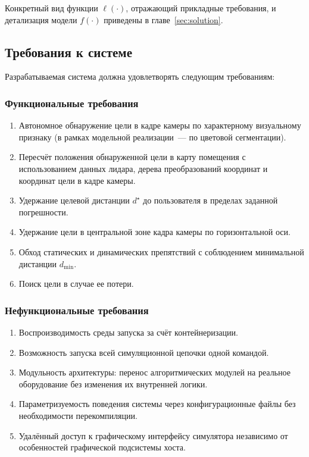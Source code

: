 Конкретный вид функции $\ell(\cdot)$, отражающий прикладные требования, и
детализация модели $f(\cdot)$ приведены в главе~\ref{sec:solution}.

\subsection{Требования к системе}

Разрабатываемая система должна удовлетворять следующим требованиям:

\subsubsection{Функциональные требования}

\begin{enumerate}
    \item Автономное обнаружение цели в кадре камеры по характерному
          визуальному признаку (в рамках модельной реализации~--- по
          цветовой сегментации).
    \item Пересчёт положения обнаруженной цели в карту помещения с
          использованием данных лидара, дерева преобразований координат и координат цели в кадре камеры.
    \item Удержание целевой дистанции $d^{\star}$ до пользователя в
          пределах заданной погрешности.
    \item Удержание цели в центральной зоне кадра камеры по
          горизонтальной оси.
    \item Обход статических и динамических препятствий с соблюдением
          минимальной дистанции $d_{\min}$.
    \item Поиск цели в случае ее потери.
\end{enumerate}

\subsubsection{Нефункциональные требования}

\begin{enumerate}
    \item Воспроизводимость среды запуска за счёт контейнеризации.
    \item Возможность запуска всей симуляционной цепочки одной командой.
    \item Модульность архитектуры: перенос алгоритмических модулей на
          реальное оборудование без изменения их внутренней логики.
    \item Параметризуемость поведения системы через конфигурационные
          файлы без необходимости перекомпиляции.
    \item Удалённый доступ к графическому интерфейсу симулятора
          независимо от особенностей графической подсистемы хоста.
\end{enumerate}

